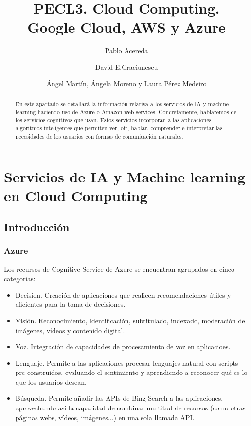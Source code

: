 \documentclass[runningheads]{llncs}
\begin{document}
\title{PECL3. Cloud Computing.\\ Google Cloud, AWS y Azure}

\author{Pablo Acereda \and  David E.Craciunescu \and Ángel Martín,  Ángela Moreno y Laura Pérez Medeiro}

%
\maketitle              
\section{Servicios de IA y Machine learning en Cloud Computing}
\begin{abstract}
    En este apartado se detallará la información relativa a los servicios de IA y machine learning haciendo uso de Azure o Amazon web services. Concretamente, hablaremos de los servicios cognitivos que usan. Estos servicios incorporan a las aplicaciones algoritmos inteligentes que permiten ver, oír, hablar, comprender e interpretar las necesidades de los usuarios con formas de comunicación naturales.
\end{abstract}

\subsection{Introducción}
    \subsubsection{Azure}
    Los recursos de Cognitive Service de Azure se encuentran agrupados en cinco categorias: 
    \begin{itemize}
        \item Decision. Creación de aplicaciones que realicen recomendaciones útiles y eficientes para la toma de decisiones.
        \item Visión. Reconocimiento, identificación, subtitulado, indexado, moderación de imágenes, vídeos y contenido digital.
        \item Voz. Integración de capacidades de procesamiento de voz en aplicacioes.
        \item Lenguaje. Permite a las aplicaciones procesar lenguajes natural con scripts pre-construidos, evaluando el sentimiento y aprendiendo a reconocer qué es lo que los usuarios desean.
        \item Búsqueda. Permite añadir las APIs de Bing Search a las aplicaciones, aprovechando así la capacidad de combinar multitud de recursos (como otras páginas webs, vídeos, imágenes...) en una sola llamada API.
    \end{itemize}
\end{document}
